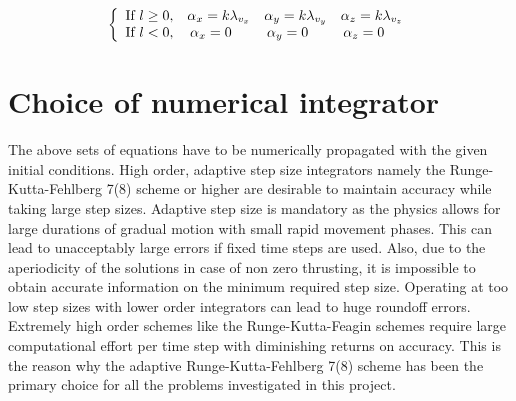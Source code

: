 \begin{align}
\left \{
\begin{array}{cccc}
\text{If } l\geq 0, &\alpha_x=k\lambda_{v_x}  &\alpha_y=k\lambda_{v_y} &\alpha_z=k\lambda_{v_z}\\
\text{If } l<0, &\hspace{-4mm}\alpha_x=0  &\hspace{-4mm}\alpha_y=0 &\hspace{-4mm}\alpha_z=0
\end{array}
\right.
\end{align}
\section{Choice of numerical integrator}
The above sets of equations have to be numerically propagated with the given initial conditions. High order, adaptive step size integrators namely the Runge-Kutta-Fehlberg 7(8) scheme or higher are desirable to maintain accuracy while taking large step sizes. Adaptive step size is mandatory as the physics allows for large durations of gradual motion with small rapid movement phases. This can lead to unacceptably large errors if fixed time steps are used. Also, due to the aperiodicity of the solutions in case of non zero thrusting, it is impossible to obtain accurate information on the minimum required step size. Operating at too low step sizes with lower order integrators can lead to huge roundoff errors. Extremely high order schemes like the Runge-Kutta-Feagin schemes \citep{feagin_tenth-order_2007} require large computational effort per time step with diminishing returns on accuracy. This is the reason why the adaptive Runge-Kutta-Fehlberg 7(8) scheme has been the primary choice for all the problems investigated in this project.
